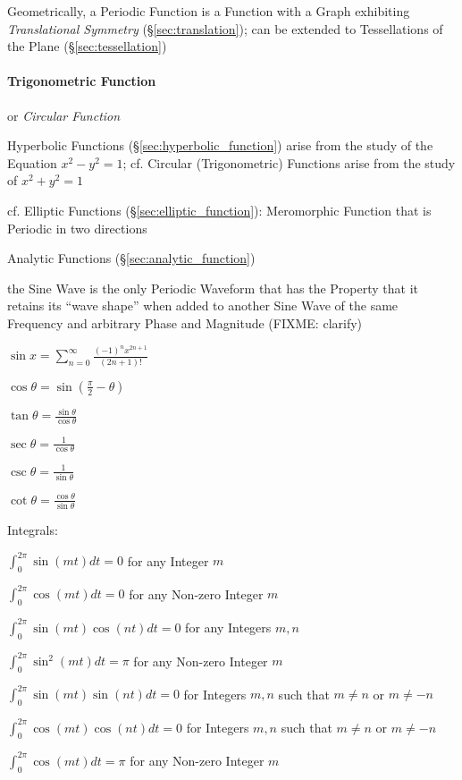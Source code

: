 Geometrically, a Periodic Function is a Function with a Graph exhibiting
\emph{Translational Symmetry} (\S\ref{sec:translation});
can be extended to Tessellations of the Plane (\S\ref{sec:tessellation})



\paragraph{Trigonometric Function}\label{sec:trigonometric_function}\hfill

or \emph{Circular Function}

Hyperbolic Functions (\S\ref{sec:hyperbolic_function}) arise from the study of
the Equation $x^2 - y^2 = 1$; cf. Circular (Trigonometric) Functions arise from
the study of $x^2 + y^2 = 1$

cf. Elliptic Functions (\S\ref{sec:elliptic_function}): Meromorphic Function
that is Periodic in two directions

Analytic Functions (\S\ref{sec:analytic_function})


the Sine Wave is the only Periodic Waveform that has the Property that it
retains its ``wave shape'' when added to another Sine Wave of the same
Frequency and arbitrary Phase and Magnitude (FIXME: clarify)

$\sin x = \sum_{n=0}^\infty \frac{(-1)^n x^{2n+1}}{(2n + 1)!}$

$\cos\theta= \sin(\frac{\pi}{2} - \theta)$

$\tan\theta = \frac{\sin\theta}{\cos\theta}$

$\sec\theta = \frac{1}{\cos\theta}$

$\csc\theta = \frac{1}{\sin\theta}$

$\cot\theta = \frac{\cos\theta}{\sin\theta}$

Integrals:

$\int_0^{2\pi} \sin(mt)dt = 0$ for any Integer $m$

$\int_0^{2\pi} \cos(mt)dt = 0$ for any Non-zero Integer $m$

$\int_0^{2\pi} \sin(mt)\cos(nt)dt = 0$ for any Integers $m,n$

$\int_0^{2\pi} \sin^2(mt)dt = \pi$ for any Non-zero Integer $m$

$\int_0^{2\pi} \sin(mt)\sin(nt)dt = 0$ for Integers $m,n$ such that $m\neq{n}$
or $m\neq{-n}$

$\int_0^{2\pi} \cos(mt)\cos(nt)dt = 0$ for Integers $m,n$ such that $m\neq{n}$
or $m\neq{-n}$

$\int_0^{2\pi} \cos(mt)dt = \pi$ for any Non-zero Integer $m$


